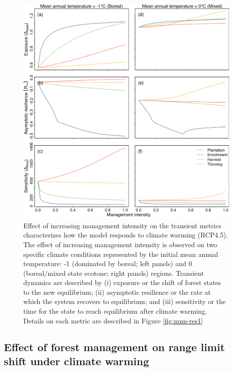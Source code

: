 \documentclass[12pt]{article}
\begin{document}
\begin{figure}
\hypertarget{fig:num-res2}{%
\centering
\includegraphics{manuscript/img/num-result_2.png}
\caption{Effect of increasing management intensity on the transient
metrics characterizes how the model responds to climate warming
(RCP4.5). The effect of increasing management intensity is observed on
two specific climate conditions represented by the initial mean annual
temperature: -1 (dominated by boreal; left panels) and 0 (boreal/mixed
state ecotone; right panels) regions. Transient dynamics are described
by (i) exposure or the shift of forest states to the new equilibrium;
(ii) asymptotic resilience or the rate at which the system recovers to
equilibrium; and (iii) sensitivity or the time for the state to reach
equilibrium after climate warming. Details on each metric are described
in Figure \ref{fig:num-res1}}\label{fig:num-res2}
}
\end{figure}

\hypertarget{effect-of-forest-management-on-range-limit-shift-under-climate-warming}{%
\subsection{Effect of forest management on range limit shift under
climate
warming}\label{effect-of-forest-management-on-range-limit-shift-under-climate-warming}}
\end{document}
